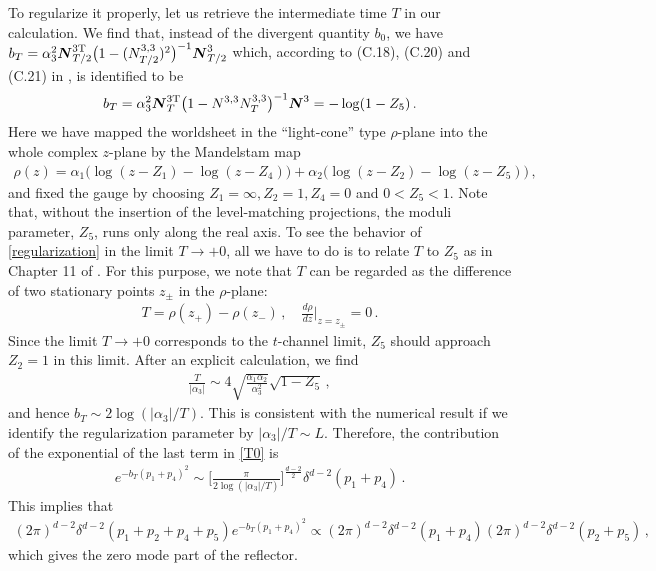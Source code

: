 \documentclass[12pt]{article}
\begin{document}
To regularize it properly, let us retrieve the intermediate time $T$
in our calculation.
We find that, instead of the divergent quantity $b_0$, we have
$b_T=\alpha_3^2\boldsymbol{N}^{3{\rm T}}_{T/2}
\bigl(1-(N^{3,3}_{T/2})^2\bigr)^{-1}
\boldsymbol{N}^3_{T/2}$ which, according to (C.18), (C.20) and (C.21)
in \cite{HIKKO2}, is identified to be
\begin{align}
b_T=\alpha_3^2\boldsymbol{N}^{3{\rm T}}_T
\bigl(1-N^{3,3}N^{3,3}_T\bigr)^{-1}
\boldsymbol{N}^3=-\log(1-Z_5)\,.
\label{regularization}
\end{align}
Here we have mapped the worldsheet in the ``light-cone'' type
$\rho$-plane into the whole complex $z$-plane by the Mandelstam map
\begin{align}
\rho(z)=\alpha_1\bigl(\log(z-Z_1)-\log(z-Z_4)\bigr)
+\alpha_2\bigl(\log(z-Z_2)-\log(z-Z_5)\bigr)\,,
\label{mandelstam}
\end{align}
and fixed the gauge by choosing $Z_1=\infty, Z_2=1, Z_4=0$ and
$0<Z_5<1$.
Note that, without the insertion of the level-matching projections,
the moduli parameter, $Z_5$, runs only along the real axis.
To see the behavior of \eqref{regularization} in the limit $T\to +0$,
all we have to do is to relate $T$ to $Z_5$ as in Chapter 11 of
\cite{GSW}.
For this purpose, we note that $T$ can be regarded as the difference
of two stationary points $z_\pm$ in the $\rho$-plane:
\begin{align}
T=\rho(z_+)-\rho(z_-)\,,\quad
\frac{d\rho}{dz}\Bigr|_{z=z_\pm}\!\!\!=0\,.
\label{stationary}
\end{align}
Since the limit $T\to +0$ corresponds to the $t$-channel limit, $Z_5$
should approach $Z_2=1$ in this limit.
After an explicit calculation, we find
\begin{align}
\frac{T}{|\alpha_3|}\sim 
4\sqrt{\frac{\alpha_1\alpha_2}{\alpha_3^2}}\sqrt{1-Z_5}\,,
\end{align}
and hence $b_T\sim 2\log(|\alpha_3|/T)$.
This is consistent with the numerical result if we identify the
regularization parameter by ${|\alpha_3|}/T\sim L$.
Therefore, the contribution of the exponential of the last term in
\eqref{T0} is
\begin{align}
e^{-b_T(p_1+p_4)^2}
\sim\biggl[\frac{\pi}{2\log(|\alpha_3|/T)}\biggr]^{\frac{d-2}{2}}
\delta^{d-2}(p_1+p_4)\,.
\end{align}
This implies that 
\begin{align}
(2\pi)^{d-2}\delta^{d-2}(p_1+p_2+p_4+p_5)e^{-b_T(p_1+p_4)^2}
\propto(2\pi)^{d-2}\delta^{d-2}(p_1+p_4)
(2\pi)^{d-2}\delta^{d-2}(p_2+p_5)\,,
\end{align}
which gives the zero mode part of the reflector.
\end{document}
